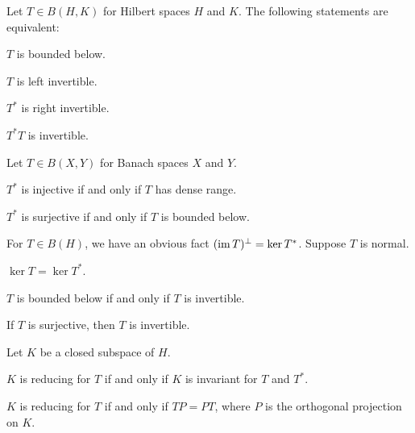 \documentclass{../../large}
\begin{document}
\begin{prb}
Let $T\in B(H,K)$ for Hilbert spaces $H$ and $K$.
The following statements are equivalent:
\begin{parts}
\item $T$ is bounded below.
\item $T$ is left invertible.
\item $T^*$ is right invertible.
\item $T^*T$ is invertible.
\end{parts}
\end{prb}

\begin{prb}
Let $T\in B(X,Y)$ for Banach spaces $X$ and $Y$.
\begin{parts}
\item $T^*$ is injective if and only if $T$ has dense range.
\item $T^*$ is surjective if and only if $T$ is bounded below.
\end{parts}
\end{prb}

\begin{prb}
For $T\in B(H)$, we have an obvious fact $(\operatorname{im} T)^\perp=\ker T^*$.
Suppose $T$ is normal.
\begin{parts}
\item $\ker T=\ker T^*$.
\item $T$ is bounded below if and only if $T$ is invertible.
\item If $T$ is surjective, then $T$ is invertible.
\end{parts}
\end{prb}

\begin{prb}
Let $K$ be a closed subspace of $H$.
\begin{parts}
\item $K$ is reducing for $T$ if and only if $K$ is invariant for $T$ and $T^*$.
\item $K$ is reducing for $T$ if and only if $TP=PT$, where $P$ is the orthogonal projection on $K$.
\end{parts}
\end{prb}
\end{document}
